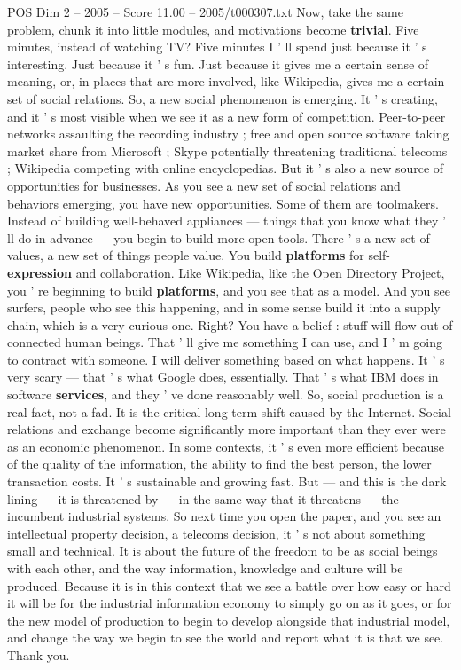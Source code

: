 \begin{textsample}{POS Dim 2 – 2005 – Score 11.00 – 2005/t000307.txt}
Now, take the same problem, chunk it into little modules, and motivations become \textbf{trivial}.
Five minutes, instead of watching TV?
Five minutes I ' ll spend just because it ' s interesting.
Just because it ' s fun.
Just because it gives me a certain sense of meaning, or, in places that are more involved, like Wikipedia, gives me a certain set of social relations.
So, a new social phenomenon is emerging.
It ' s creating, and it ' s most visible when we see it as a new form of competition.
Peer-to-peer networks assaulting the recording industry ; free and open source software taking market share from Microsoft ; Skype potentially threatening traditional telecoms ; Wikipedia competing with online encyclopedias.
But it ' s also a new source of opportunities for businesses.
As you see a new set of social relations and behaviors emerging, you have new opportunities.
Some of them are toolmakers.
Instead of building well-behaved appliances — things that you know what they ' ll do in advance — you begin to build more open tools.
There ' s a new set of values, a new set of things people value.
You build \textbf{platforms} for self- \textbf{expression} and collaboration.
Like Wikipedia, like the Open Directory Project, you ' re beginning to build \textbf{platforms}, and you see that as a model.
And you see surfers, people who see this happening, and in some sense build it into a supply chain, which is a very curious one.
Right?
You have a belief : stuff will flow out of connected human beings.
That ' ll give me something I can use, and I ' m going to contract with someone.
I will deliver something based on what happens.
It ' s very scary — that ' s what Google does, essentially.
That ' s what IBM does in software \textbf{services}, and they ' ve done reasonably well.
So, social production is a real fact, not a fad.
It is the critical long-term shift caused by the Internet.
Social relations and exchange become significantly more important than they ever were as an economic phenomenon.
In some contexts, it ' s even more efficient because of the quality of the information, the ability to find the best person, the lower transaction costs.
It ' s sustainable and growing fast.
But — and this is the dark lining — it is threatened by — in the same way that it threatens — the incumbent industrial systems.
So next time you open the paper, and you see an intellectual property decision, a telecoms decision, it ' s not about something small and technical.
It is about the future of the freedom to be as social beings with each other, and the way information, knowledge and culture will be produced.
Because it is in this context that we see a battle over how easy or hard it will be for the industrial information economy to simply go on as it goes, or for the new model of production to begin to develop alongside that industrial model, and change the way we begin to see the world and report what it is that we see.
Thank you.

\end{textsample}
